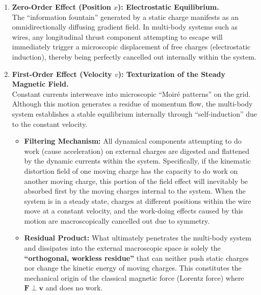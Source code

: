 \documentclass[12pt, a4paper]{article}
\begin{document}
\begin{enumerate}
    \item \textbf{Zero-Order Effect (Position $x$): Electrostatic Equilibrium.}\\
    The ``information fountain'' generated by a static charge manifests as an omnidirectionally diffusing gradient field. In multi-body systems such as wires, any longitudinal thrust component attempting to escape will immediately trigger a microscopic displacement of free charges (electrostatic induction), thereby being perfectly cancelled out internally within the system.

    \item \textbf{First-Order Effect (Velocity $v$): Texturization of the Steady Magnetic Field.}\\
    Constant currents interweave into microscopic ``Moiré patterns'' on the grid. Although this motion generates a residue of momentum flow, the multi-body system establishes a stable equilibrium internally through ``self-induction'' due to the constant velocity.
    \begin{itemize}
        \item \textbf{Filtering Mechanism:} All dynamical components attempting to do work (cause acceleration) on external charges are digested and flattened by the dynamic currents within the system. Specifically, if the kinematic distortion field of one moving charge has the capacity to do work on another moving charge, this portion of the field effect will inevitably be absorbed first by the moving charges internal to the system. When the system is in a steady state, charges at different positions within the wire move at a constant velocity, and the work-doing effects caused by this motion are macroscopically cancelled out due to symmetry.
        \item \textbf{Residual Product:} What ultimately penetrates the multi-body system and dissipates into the external macroscopic space is solely the \textbf{``orthogonal, workless residue''} that can neither push static charges nor change the kinetic energy of moving charges. This constitutes the mechanical origin of the classical magnetic force (Lorentz force) where $\bm{F} \perp \bm{v}$ and does no work.
    \end{itemize}


\end{enumerate}
\end{document}
